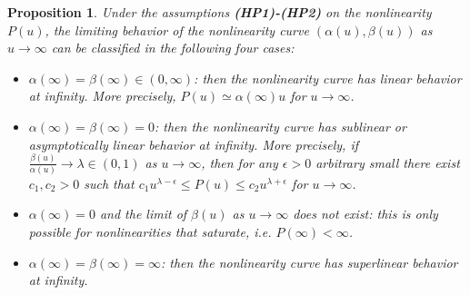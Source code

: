 \documentclass[reqno]{amsart}
\newtheorem{prop}[lemma]{Proposition}
\begin{document}
\begin{prop}\label{prop:behaviorinfty}
Under the assumptions  {\bf (HP1)-(HP2)} on the nonlinearity $P(u)$, the limiting behavior of the nonlinearity curve $(\alpha(u),\beta(u))$ as $u\to\infty$ can be classified in the following four cases:
\begin{itemize}
\item[(a)] $\alpha(\infty)=\beta(\infty)\in (0,\infty)$: then the nonlinearity curve has linear behavior at infinity. More precisely, $P(u)\simeq \alpha(\infty) u$ for $u\to\infty$.

\item[(b)] $\alpha(\infty)=\beta(\infty)=0$: then the nonlinearity curve has sublinear or asymptotically linear behavior at infinity. More precisely, if $\frac{\beta(u)}{\alpha(u)}\to \lambda \in (0,1)$ as $u\to \infty$, then for any $\epsilon>0$ arbitrary small there exist $c_1,c_2>0$ such that $c_1 u^{\lambda-\epsilon} \leq P(u)\leq c_2 u^{\lambda+\epsilon}$ for $u\to\infty$.

\item[(c)]  $\alpha(\infty)=0$ and the limit of $\beta(u)$ as $u\to\infty$ does not exist: this is only possible for nonlinearities that saturate, i.e. $P(\infty)<\infty$.

\item[(d)]  $\alpha(\infty)=\beta(\infty)=\infty$: then the nonlinearity curve has superlinear  behavior at infinity.
\end{itemize}
\end{prop}
\end{document}
